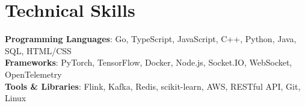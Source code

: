 \section{Technical Skills}
 \begin{itemize}[leftmargin=0.15in, label={}]
    \small{\item{
     \textbf{Programming Languages}{: Go, TypeScript, JavaScript, C++, Python, Java,  SQL, HTML/CSS} \\
     \textbf{Frameworks}{: PyTorch, TensorFlow, Docker, Node.js, Socket.IO, WebSocket, OpenTelemetry } \\
     \textbf{Tools \& Libraries}{: Flink, Kafka, Redis, scikit-learn, AWS, RESTful API, Git, Linux} \\
    }}
 \end{itemize}
